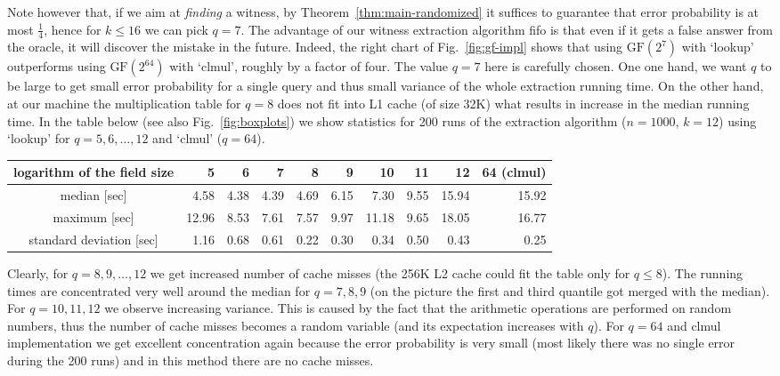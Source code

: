 \documentclass[11pt]{article}
\newcommand{\field}[1]{{\textrm{GF}}({#1})}
\begin{document}
 Note however that, if we aim at {\em finding} a witness, by Theorem~\ref{thm:main-randomized} it suffices to guarantee that error probability is at most $\frac{1}4$, hence for $k\le 16$ we can pick $q=7$. The advantage of our witness extraction algorithm fifo is that even if it gets a false answer from the oracle, it will discover the mistake in the future. Indeed, the right chart of  Fig.~\ref{fig:gf-impl} shows that using $\field{2^7}$ with `lookup' outperforms using $\field{2^{64}}$ with `clmul', roughly by a factor of four. 
The value $q=7$ here is carefully chosen. One one hand, we want $q$ to be large to get small error probability for a single query and thus small variance of the whole extraction running time. On the other hand, at our machine the multiplication table for $q=8$ does not fit into L1 cache (of size 32K) what results in increase in the median running time. In the table below (see also Fig.~\ref{fig:boxplots}) we show statistics for 200 runs of the extraction algorithm ($n=1000$, $k=12$) using `lookup' for $q=5,6,\ldots,12$ and `clmul' ($q=64$). 

{\footnotesize
\begin{center}
\begin{tabular}{|c|r|r|r|r|r|r|r|r|r|}\hline
logarithm of the field size &  5 & 6 & 7 & 8 & 9 & 10 & 11 & 12 & 64 (clmul)\\\hline
median [sec] &  4.58 & 4.38 & 4.39 & 4.69 & 6.15 & 7.30 & 9.55 & 15.94 & 15.92\\\hline
maximum [sec] & 12.96 &  8.53 & 7.61 & 7.57 & 9.97 & 11.18 & 9.65 & 18.05 & 16.77\\\hline
standard deviation [sec] & 1.16 & 0.68 & 0.61 & 0.22 & 0.30 & 0.34 & 0.50 & 0.43 & 0.25 \\\hline
\end{tabular}
\end{center}
}
 
 Clearly, for $q=8,9,\ldots,12$ we get increased number of cache misses (the 256K L2 cache could fit the table only for $q\le 8$). 
 The running times are concentrated very well around the median for $q=7,8,9$ (on the picture the first and third quantile got merged with the median).
 For $q=10,11,12$ we observe increasing variance. This is caused by the fact that the arithmetic operations are performed on random numbers,
 thus the number of cache misses becomes a random variable (and its expectation increases with $q$). 
 For $q=64$ and clmul implementation we get excellent concentration again because the error probability is very small (most likely there was no single error during the 200 runs) and in this method there are no cache misses. 
\end{document}
